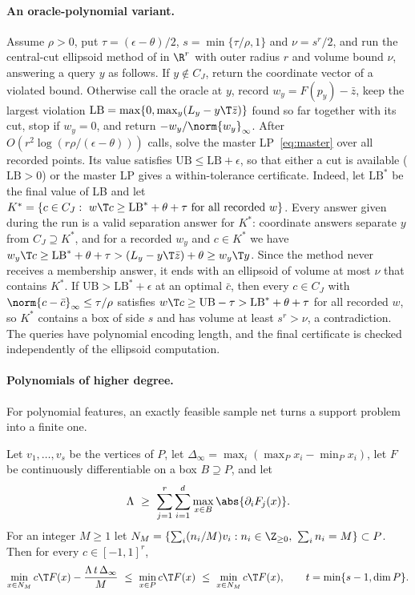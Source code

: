 \paragraph{An oracle-polynomial variant.}
Assume $\rho>0$, put $\tau=(\epsilon-\theta)/2$, $s=\min\{\tau/\rho,1\}$ and
$\nu=s^r/2$, and run the central-cut ellipsoid method of
\citet[Theorem~3.2.1]{GrotschelLovaszSchrijver1988} in $\R^r$ with outer radius
$r$ and volume bound $\nu$, answering a query $y$ as follows. If $y\notin C_J$,
return the coordinate vector of a violated bound. Otherwise call the oracle at
$y$, record $w_y=F(p_y)-\bar z$, keep the largest violation
$\mathrm{LB}=\max\{0,\max_y(L_y-y\T\bar z)\}$ found so far together with its cut,
stop if $w_y=0$, and return $-w_y/\norm{w_y}_\infty$. After
$O(r^2\log(r\rho/(\epsilon-\theta)))$ calls, solve the master LP~\eqref{eq:master}
over all recorded points. Its value satisfies $\mathrm{UB}\le\mathrm{LB}+\epsilon$,
so that either a cut is available ($\mathrm{LB}>0$) or the master LP gives a
within-tolerance certificate. Indeed, let $\mathrm{LB}^\ast$ be the final value
of LB and let
$K^\ast=\{c\in C_J:\ w\T c\ge\mathrm{LB}^\ast+\theta+\tau\ \text{for all recorded }w\}$.
Every answer given during the run is a valid separation answer for $K^\ast$:
coordinate answers separate $y$ from $C_J\supseteq K^\ast$, and for a recorded
$w_y$ and $c\in K^\ast$ we have
$w_y\T c\ge\mathrm{LB}^\ast+\theta+\tau>(L_y-y\T\bar z)+\theta\ge w_y\T y$. Since the
method never receives a membership answer, it ends with an ellipsoid of
volume at most $\nu$ that contains $K^\ast$. If $\mathrm{UB}>\mathrm{LB}^\ast+\epsilon$
at an optimal $\bar c$, then every $c\in C_J$ with $\norm{c-\bar c}_\infty\le\tau/\rho$
satisfies $w\T c\ge\mathrm{UB}-\tau>\mathrm{LB}^\ast+\theta+\tau$ for all recorded $w$,
so $K^\ast$ contains a box of side $s$ and has volume at least $s^r>\nu$, a
contradiction. The queries have polynomial encoding length, and the final
certificate is checked independently of the ellipsoid computation.

\paragraph{Polynomials of higher degree.}
For polynomial features, an exactly feasible sample net turns a support
problem into a finite one.

\begin{lemma}\label{lem:net}
Let $v_1,\dots,v_s$ be the vertices of $P$, let
$\Delta_\infty=\max_i(\max_Px_i-\min_Px_i)$, let $F$ be continuously
differentiable on a box $B\supseteq P$, and let
\[
\Lambda\ \ge\ \sum_{j=1}^r\sum_{i=1}^d\max_{x\in B}\abs{\partial_iF_j(x)}.
\]
For an integer $M\ge1$ let
$N_M=\{\sum_i(n_i/M)v_i:n_i\in\Z_{\ge0},\ \sum_in_i=M\}\subset P$. Then for every
$c\in[-1,1]^r$,
\[
\min_{x\in N_M}c\T F(x)-\frac{\Lambda\,t\,\Delta_\infty}M\ \le\ \min_{x\in P}c\T F(x)\ \le\ \min_{x\in N_M}c\T F(x),
\qquad t=\min\{s-1,\dim P\}.
\]
\end{lemma}


